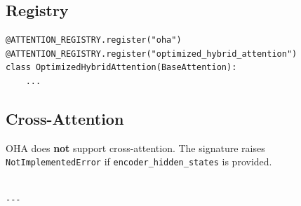 \subsection{Registry}

\begin{lstlisting}
@ATTENTION_REGISTRY.register("oha")
@ATTENTION_REGISTRY.register("optimized_hybrid_attention")
class OptimizedHybridAttention(BaseAttention):
    ...
\end{lstlisting}

\subsection{Cross-Attention}

OHA does \textbf{not} support cross-attention. The signature raises 
\texttt{NotImplementedError} if \texttt{encoder\_hidden\_states} is provided.
\begin{lstlisting}

---
\end{lstlisting}